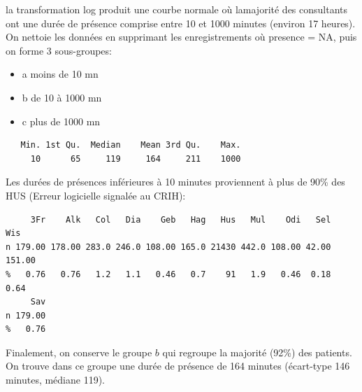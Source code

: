 \documentclass[12pt,english,french,twoside]{book}\usepackage[]{graphicx}\usepackage[]{color}
\makeatletter
\newenvironment{kframe}{%
 \def\at@end@of@kframe{}%
 \ifinner\ifhmode%
  \def\at@end@of@kframe{\end{minipage}}%
  \begin{minipage}{\columnwidth}%
 \fi\fi%
 \def\FrameCommand##1{\hskip\@totalleftmargin \hskip-\fboxsep
 \colorbox{shadecolor}{##1}\hskip-\fboxsep
     \hskip-\linewidth \hskip-\@totalleftmargin \hskip\columnwidth}%
 \MakeFramed {\advance\hsize-\width
   \@totalleftmargin\z@ \linewidth\hsize
   \@setminipage}}%
 {\par\unskip\endMakeFramed%
 \at@end@of@kframe}
\newenvironment{knitrout}{}{} %
\makeatother
\begin{document}
la transformation log produit une courbe normale où lamajorité des consultants ont une durée de présence comprise entre 10 et 1000 minutes (environ 17 heures). On nettoie les données en supprimant les enregistrements où presence = NA, puis on forme 3 sous-groupes:
\begin{itemize}
  \item a moins de 10 mn
  \item b de 10 à 1000 mn
  \item c plus de 1000 mn
\end{itemize}

\begin{knitrout}
\color{fgcolor}\begin{kframe}
\begin{verbatim}
   Min. 1st Qu.  Median    Mean 3rd Qu.    Max. 
     10      65     119     164     211    1000 
\end{verbatim}
\end{kframe}
\end{knitrout}


Les durées de présences inférieures à 10 minutes proviennent à plus de 90\% des HUS (Erreur logicielle signalée au CRIH):
\begin{knitrout}
\color{fgcolor}\begin{kframe}
\begin{verbatim}
     3Fr    Alk   Col   Dia    Geb   Hag   Hus   Mul    Odi   Sel    Wis
n 179.00 178.00 283.0 246.0 108.00 165.0 21430 442.0 108.00 42.00 151.00
%   0.76   0.76   1.2   1.1   0.46   0.7    91   1.9   0.46  0.18   0.64
     Sav
n 179.00
%   0.76
\end{verbatim}
\end{kframe}
\end{knitrout}


Finalement, on conserve le groupe $b$ qui regroupe la majorité (92\%) des patients. On trouve dans ce groupe une durée de présence de 164 minutes (écart-type 146 minutes, médiane 119).
\end{document}
